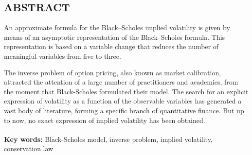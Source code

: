 \documentclass[a4 paper, 12pt]{report}
\theoremstyle{plain}
\begin{document}
\newpage
\begin{center}
	\section*{ABSTRACT}
\end{center}
\noindent
\par An approximate formula for the Black–Scholes implied volatility is given by means of an asymptotic representation of the Black–Scholes formula. This representation is based on a variable change that reduces the number of meaningful variables from five to three.\\
\par The inverse problem of option pricing, also known as market calibration, attracted the attention of a large number of practitioners and academics, from the moment that Black-Scholes formulated their model. The search for an explicit expression of volatility as a function of the observable variables has generated a vast body of literature, forming a specific branch of quantitative finance. But up to now, no exact expression of implied volatility has been obtained.\\\\

\textbf{Key words:} Black-Scholes model, inverse problem, implied volatility, conservation law


\end{document}
